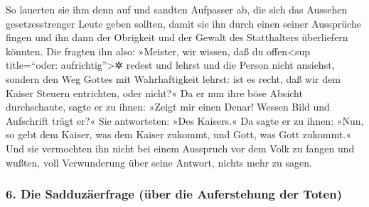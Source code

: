  So lauerten sie ihm denn auf und sandten Aufpasser ab,
die sich das Aussehen gesetzesstrenger Leute geben sollten, damit sie
ihn durch einen seiner Aussprüche fingen und ihn dann der Obrigkeit und
der Gewalt des Statthalters überliefern könnten.  Die
fragten ihn also: »Meister, wir wissen, daß du offen\textless sup
title=``oder: aufrichtig''\textgreater✲ redest und lehrst und die Person
nicht ansiehst, sondern den Weg Gottes mit Wahrhaftigkeit lehrst:
 ist es recht, daß wir dem Kaiser Steuern entrichten,
oder nicht?«  Da er nun ihre böse Absicht durchschaute,
sagte er zu ihnen:  »Zeigt mir einen Denar! Wessen Bild
und Aufschrift trägt er?« Sie antworteten: »Des Kaisers.«
 Da sagte er zu ihnen: »Nun, so gebt dem Kaiser, was dem
Kaiser zukommt, und Gott, was Gott zukommt.«  Und sie
vermochten ihn nicht bei einem Ausspruch vor dem Volk zu fangen und
wußten, voll Verwunderung über seine Antwort, nichts mehr zu sagen.

\hypertarget{die-sadduzuxe4erfrage-uxfcber-die-auferstehung-der-toten}{%
\subsubsection{6. Die Sadduzäerfrage (über die Auferstehung der
Toten)}\label{die-sadduzuxe4erfrage-uxfcber-die-auferstehung-der-toten}}

